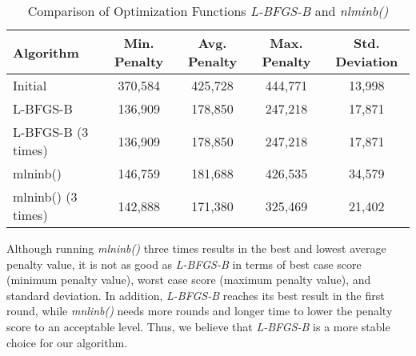 \begin{table}[hbt]
\caption{Comparison of Optimization Functions \emph{L-BFGS-B} and \emph{nlminb()}}\label{tab:optim-comp}\centering\small
\begin{tabular}{lcccc} \toprule
  Algorithm           & Min. Penalty  & Avg. Penalty  & Max. Penalty  & Std. Deviation  \\ \hline
  Initial             & 370,584       & 425,728       & 444,771       & 13,998          \\
  L-BFGS-B            & 136,909       & 178,850       & 247,218       & 17,871          \\
  L-BFGS-B (3 times)  & 136,909       & 178,850       & 247,218       & 17,871          \\
  mlninb()            & 146,759       & 181,688       & 426,535       & 34,579          \\
  mlninb() (3 times)  & 142,888       & 171,380       & 325,469       & 21,402          \\ \bottomrule
\end{tabular}
\end{table}

Although running \emph{mlninb()} three times results in the best and lowest average penalty value, it is not as good as \emph{L-BFGS-B} in terms of best case score (minimum penalty value), worst case score (maximum penalty value), and standard deviation. In addition, \emph{L-BFGS-B} reaches its best result in the first round, while \emph{mnlinb()} needs more rounds and longer time to lower the penalty score to an acceptable level. Thus, we believe that \emph{L-BFGS-B} is a more stable choice for our algorithm.
